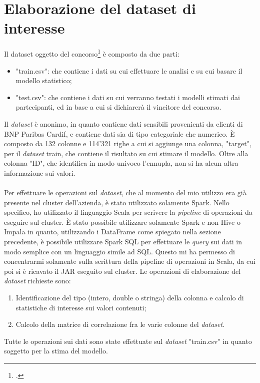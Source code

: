 \section{Elaborazione del dataset di interesse} \label{dataset}
Il dataset oggetto del concorso\footcite{https://www.kaggle.com/c/bnp-paribas-cardif-claims-management/data} è composto da due parti:
\begin{itemize}
	\item "train.csv": che contiene i dati su cui effettuare le analisi e su cui basare il modello statistico;
	\item "test.csv": che contiene i dati su cui verranno testati i modelli stimati dai partecipanti, ed in base a cui si dichiarerà il vincitore del concorso.
\end{itemize}
Il \textit{dataset} è anonimo, in quanto contiene dati sensibili provenienti da clienti di BNP Paribas Cardif, e contiene dati sia di tipo categoriale che numerico.  È composto da 132 colonne e 114'321 righe a cui si aggiunge una colonna, "target", per il \textit{dataset} train, che contiene il risultato su cui stimare il modello. Oltre alla colonna "ID", che identifica in modo univoco l'ennupla, non si ha alcun altra informazione sui valori.\\\\
Per effettuare le operazioni sul \textit{dataset}, che al momento del mio utilizzo era già presente nel \gls{cluster} dell'azienda, è stato utilizzato solamente Spark. Nello specifico, ho utilizzato il linguaggio Scala per scrivere la \textit{pipeline} di operazioni da eseguire sul \gls{cluster}. È stato possibile utilizzare solamente Spark e non Hive o Impala in quanto, utilizzando i DataFrame come spiegato nella sezione precedente, è possibile utilizzare Spark SQL per effettuare le \textit{query} sui dati in modo semplice con un linguaggio simile ad SQL.
Questo mi ha permesso di concentrarmi solamente sulla scrittura della pipeline di operazioni in Scala, da cui poi si è ricavato il \gls{JAR} eseguito sul \gls{cluster}.
Le operazioni di elaborazione del \textit{dataset} richieste sono:
\begin{enumerate}
	\item Identificazione del tipo (intero, double o stringa) della colonna e calcolo di statistiche di interesse sui valori contenuti;
	\item Calcolo della matrice di correlazione fra le varie colonne del \textit{dataset}.
\end{enumerate}
Tutte le operazioni sui dati sono state effettuate sul \textit{dataset} "train.csv" in quanto soggetto per la stima del modello.

